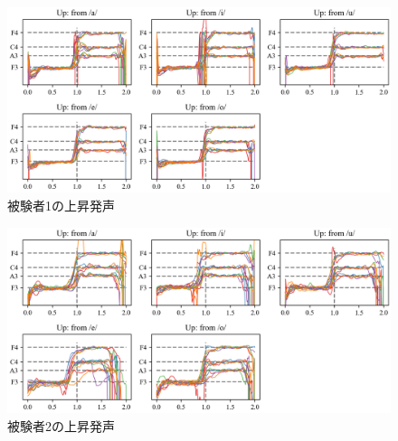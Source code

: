 \documentclass[10ptj,a4j,dvipdfmx,uplatex, oneside, openany]{jsbook}%
\begin{document}
\begin{figure}[htbp]
    \begin{center}
      \includegraphics[clip,width=16.0cm]{F0_up_1.png}
      \caption{被験者1の上昇発声}
      \label{fig:u1}
    \end{center}
\end{figure}

\begin{figure}[htbp]
    \begin{center}
      \includegraphics[clip,width=16.0cm]{F0_up_2.png}
      \caption{被験者2の上昇発声}
      \label{fig:u2}
    \end{center}
\end{figure}
\end{document}
